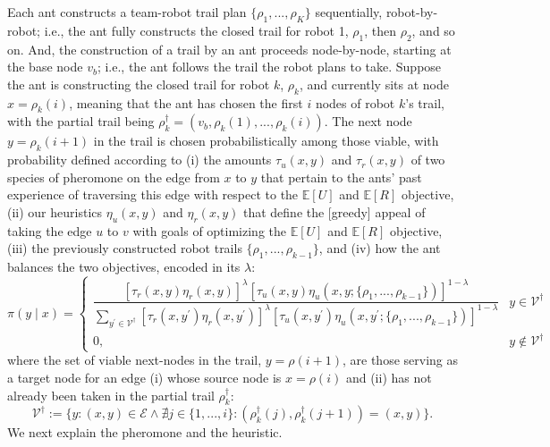 \documentclass[11pt, oneside]{article}
\begin{document}
Each ant constructs a team-robot trail plan $\{\rho_1, ..., \rho_K\}$ sequentially, robot-by-robot; i.e., the ant fully constructs the closed trail for robot 1, $\rho_1$, then $\rho_2$, and so on. And, the construction of a trail by an ant proceeds node-by-node, starting at the base node $v_b$; i.e., the ant follows the trail the robot plans to take. Suppose the ant is constructing the closed trail for robot $k$, $\rho_k$, and currently sits at node $x=\rho_k(i)$, meaning that the ant has chosen the first $i$ nodes of robot $k$'s trail, with the partial trail being $\rho_k^\dagger=(v_b, \rho_k(1), ..., \rho_k(i))$. 
The next node $y=\rho_k(i+1)$ in the trail is chosen probabilistically among those viable, with probability defined according to (i) the amounts $\tau_u(x, y)$ and $\tau_r(x, y)$ of two species of pheromone on the edge from $x$ to $y$ that pertain to the ants' past experience of traversing this edge with respect to the $\mathbb{E}[U]$ and $\mathbb{E}[R]$ objective, (ii) our heuristics $\eta_u(x, y)$ and $\eta_r(x, y)$  that define the [greedy] appeal of taking the edge $u$ to $v$ with goals of optimizing the $\mathbb{E}[U]$ and $\mathbb{E}[R]$ objective, (iii) the previously constructed robot trails $\{\rho_1, ..., \rho_{k-1}\}$, and (iv) how the ant balances the two objectives, encoded in its $\lambda$:
\begin{equation}
	\pi(y \mid x) = 
	\begin{cases}
		\dfrac{
		 \left[\tau_r(x, y) \eta_r(x, y) \right]^\lambda \left[ \tau_u(x, y) \eta_u(x, y; \{\rho_1, ..., \rho_{k-1}\}) \right]^{1-\lambda} }{
		 \sum_{y^\prime \in \mathcal{V}^\dagger} \left[\tau_r(x, y^\prime) \eta_r(x, y^\prime) \right]^\lambda \left[ \tau_u(x, y^\prime) \eta_u(x, y^\prime; \{\rho_1, ..., \rho_{k-1}\}) \right]^{1-\lambda} 
		 }
		 &
		 y \in \mathcal{V}^\dagger
		  \\
		 0, & y \notin \mathcal{V}^\dagger
	\end{cases} \label{eq:prob_x_y}
\end{equation} where the set of viable next-nodes in the trail, $y=\rho(i+1)$, are those serving as a target node for an edge (i) whose source node is $x=\rho(i)$ and (ii) has not already been taken in the partial trail $\rho_k^\dagger$:
\begin{equation}
 	\mathcal{V}^\dagger := \{ y : (x, y) \in \mathcal{E} \land \nexists j \in \{1, ..., i\} : (\rho_k^\dagger(j), \rho_k^\dagger(j+1))= (x, y)  \}.
\end{equation}
We next explain the pheromone and the heuristic.
\end{document}
